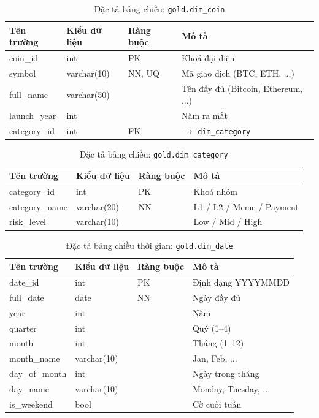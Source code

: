\begin{table}[H]
\centering
\caption{Đặc tả bảng chiều: \texttt{gold.dim\_coin}}
\label{tab:dim_coin}
\begin{tabular}{@{}llll@{}}
\toprule
\textbf{Tên trường} & \textbf{Kiểu dữ liệu} & \textbf{Ràng buộc} & \textbf{Mô tả} \\ \midrule
coin\_id & int & PK & Khoá đại diện \\
symbol & varchar(10) & NN, UQ & Mã giao dịch (BTC, ETH, ...) \\
full\_name & varchar(50) & & Tên đầy đủ (Bitcoin, Ethereum, ...) \\
launch\_year & int & & Năm ra mắt \\
category\_id & int & FK & $\rightarrow$ \texttt{dim\_category} \\ \bottomrule
\end{tabular}
\end{table}

\begin{table}[H]
\centering
\caption{Đặc tả bảng chiều: \texttt{gold.dim\_category}}
\label{tab:dim_category}
\begin{tabular}{@{}llll@{}}
\toprule
\textbf{Tên trường} & \textbf{Kiểu dữ liệu} & \textbf{Ràng buộc} & \textbf{Mô tả} \\ \midrule
category\_id & int & PK & Khoá nhóm \\
category\_name & varchar(20) & NN & L1 / L2 / Meme / Payment \\
risk\_level & varchar(10) & & Low / Mid / High \\ \bottomrule
\end{tabular}
\end{table}

\begin{table}[H]
\centering
\caption{Đặc tả bảng chiều thời gian: \texttt{gold.dim\_date}}
\label{tab:dim_date}
\begin{tabular}{@{}llll@{}}
\toprule
\textbf{Tên trường} & \textbf{Kiểu dữ liệu} & \textbf{Ràng buộc} & \textbf{Mô tả} \\ \midrule
date\_id & int & PK & Định dạng YYYYMMDD \\
full\_date & date & NN & Ngày đầy đủ \\
year & int & & Năm \\
quarter & int & & Quý (1--4) \\
month & int & & Tháng (1--12) \\
month\_name & varchar(10) & & Jan, Feb, ... \\
day\_of\_month & int & & Ngày trong tháng \\
day\_name & varchar(10) & & Monday, Tuesday, ... \\
is\_weekend & bool & & Cờ cuối tuần \\ \bottomrule
\end{tabular}
\end{table}

